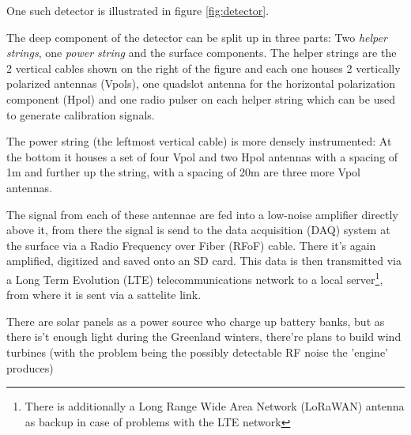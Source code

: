 \documentclass[11pt,a4paper,faculty=we,language=en,doctype=report]{cls/ugent-doc}
\begin{document}
One such detector is illustrated in figure \ref{fig:detector}.

The deep component of the detector can be split up in three parts: Two \textit{helper strings}, one \textit{power string} and the surface components. The helper strings are the 2 vertical cables shown on the right of the figure and each one houses 2 vertically polarized antennas (Vpols), one quadslot antenna for the horizontal polarization component (Hpol) and one radio pulser on each helper string which can be used to generate calibration signals.

The power string (the leftmost vertical cable) is more densely instrumented: At the bottom it houses a set of four Vpol and two Hpol antennas with a spacing of 1m and further up the string, with a spacing of 20m are three more Vpol antennas.

The signal from each of these antennae are fed into a low-noise amplifier directly above it, from there the signal is send to the data acquisition (DAQ) system at the surface via a Radio Frequency over Fiber (RFoF) cable. There it's again amplified, digitized and saved onto an SD card. This data is then transmitted via a Long Term Evolution (LTE) telecommunications network to a local server\footnote{There is additionally a Long Range Wide Area Network (LoRaWAN) antenna as backup in case of problems with the LTE network}, from where it is sent via a sattelite link.

There are solar panels as a power source who charge up battery banks, but as there is't enough light during the Greenland winters, there're plans to build wind turbines (with the problem being the possibly detectable RF noise the 'engine' produces)
\end{document}
